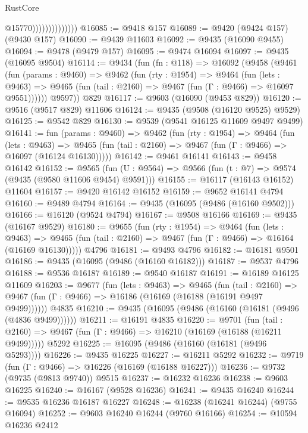 \begin{lexlean}{RustCore}
\begin{coremodule}
                                @15770))))))))))))))
@16085 := @9418 @157
@16089 := @9420 (@9424 @157) (@9430 @157)
@16090 := @9439 @11603
@16092 := @9435 (@16090 @9455)
@16094 := @9478 (@9479 @157)
@16095 := @9474 @16094
@16097 := @9435 (@16095 @9504)
@16114 := @9434
    (fun (fn : @118) =>
    @16092
      (@9458
        (@9461
          (fun (params : @9460) =>
          @9462
            (fun (rty : @1954) =>
            @9464
              (fun (lets : @9463) =>
              @9465 (fun (tail : @2160) => @9467 (fun (Γ : @9466) => @16097 @9551))))))
        @9597))
    @829
@16117 := @9603 (@16090 (@9453 @829))
@16120 := @9516 (@9517 @829) @11606
@16124 := @9435 (@9508 (@16120 @9525) @9529)
@16125 := @9542 @829
@16130 := @9539 (@9541 @16125 @11609 @9497 @9499)
@16141 := fun (params : @9460) =>
  @9462
    (fun (rty : @1954) =>
    @9464
      (fun (lets : @9463) =>
      @9465 (fun (tail : @2160) => @9467 (fun (Γ : @9466) => @16097 (@16124 @16130)))))
@16142 := @9461 @16141
@16143 := @9458 @16142
@16152 := @9565
    (fun (U : @9564) => @9566 (fun (t : @7) => @9574 (@9435 (@9580 @11606 @9454) @9591)))
@16155 := @16117 (@16143 @16152) @11604
@16157 := @9420 @16142 @16152
@16159 := @9652 @16141 @4794
@16160 := @9489 @4794
@16164 := @9435 (@16095 (@9486 (@16160 @9502)))
@16166 := @16120 (@9524 @4794)
@16167 := @9508 @16166
@16169 := @9435 (@16167 @9529)
@16180 := @9655
    (fun (rty : @1954) =>
    @9464
      (fun (lets : @9463) =>
      @9465 (fun (tail : @2160) => @9467 (fun (Γ : @9466) => @16164 (@16169 @16130)))))
    @4796
@16181 := @9493 @4796
@16182 := @16181 @9501
@16186 := @9435 (@16095 (@9486 (@16160 @16182)))
@16187 := @9537 @4796
@16188 := @9536 @16187
@16189 := @9540 @16187
@16191 := @16189 @16125 @11609
@16203 := @9677
    (fun (lets : @9463) =>
    @9465
      (fun (tail : @2160) =>
      @9467 (fun (Γ : @9466) => @16186 (@16169 (@16188 (@16191 @9497 @9499))))))
    @4835
@16210 := @9435 (@16095 (@9486 (@16160 (@16181 (@9496 (@4836 @9499))))))
@16211 := @16191 @4835
@16220 := @9701
    (fun (tail : @2160) => @9467 (fun (Γ : @9466) => @16210 (@16169 (@16188 (@16211 @9499)))))
    @5292
@16225 := @16095 (@9486 (@16160 (@16181 (@9496 @5293))))
@16226 := @9435 @16225
@16227 := @16211 @5292
@16232 := @9719 (fun (Γ : @9466) => @16226 (@16169 (@16188 @16227)))
@16236 := @9732 (@9735 (@9813 @9740)) @9515
@16237 := @16232 @16236
@16238 := @9603 @16225
@16240 := @16167 (@9528 @16236)
@16241 := @9435 @16240
@16244 := @9535 @16236 @16187 @16227
@16248 := @16238 (@16241 @16244) (@9755 @16094)
@16252 := @9603 @16240 @16244 (@9760 @16166)
@16254 := @10594 @16236 @2412

\end{coremodule}
\end{lexlean}
